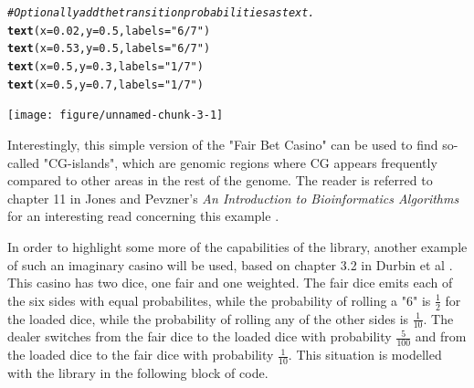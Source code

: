 \documentclass{article}\usepackage[]{graphicx}\usepackage[]{color}
\makeatletter
\newcommand{\hlnum}[1]{\textcolor[rgb]{0.686,0.059,0.569}{#1}}%
\newcommand{\hlstr}[1]{\textcolor[rgb]{0.192,0.494,0.8}{#1}}%
\newcommand{\hlcom}[1]{\textcolor[rgb]{0.678,0.584,0.686}{\textit{#1}}}%
\newcommand{\hlstd}[1]{\textcolor[rgb]{0.345,0.345,0.345}{#1}}%
\newcommand{\hlkwc}[1]{\textcolor[rgb]{0.333,0.667,0.333}{#1}}%
\newcommand{\hlkwd}[1]{\textcolor[rgb]{0.737,0.353,0.396}{\textbf{#1}}}%
\newenvironment{kframe}{%
 \def\at@end@of@kframe{}%
 \ifinner\ifhmode%
  \def\at@end@of@kframe{\end{minipage}}%
  \begin{minipage}{\columnwidth}%
 \fi\fi%
 \def\FrameCommand##1{\hskip\@totalleftmargin \hskip-\fboxsep
 \colorbox{shadecolor}{##1}\hskip-\fboxsep
     \hskip-\linewidth \hskip-\@totalleftmargin \hskip\columnwidth}%
 \MakeFramed {\advance\hsize-\width
   \@totalleftmargin\z@ \linewidth\hsize
   \@setminipage}}%
 {\par\unskip\endMakeFramed%
 \at@end@of@kframe}
\newenvironment{knitrout}{}{} %
\makeatother
\begin{document}
\begin{center}
\begin{knitrout}
\begin{kframe}
\begin{alltt}
\hlcom{# Optionally add the transition probabilities as text.}
\hlkwd{text}\hlstd{(}\hlkwc{x} \hlstd{=} \hlnum{0.02}\hlstd{,} \hlkwc{y} \hlstd{=} \hlnum{0.5}\hlstd{,} \hlkwc{labels} \hlstd{=} \hlstr{"6/7"}\hlstd{)}
\hlkwd{text}\hlstd{(}\hlkwc{x} \hlstd{=} \hlnum{0.53}\hlstd{,} \hlkwc{y} \hlstd{=} \hlnum{0.5}\hlstd{,} \hlkwc{labels} \hlstd{=} \hlstr{"6/7"}\hlstd{)}
\hlkwd{text}\hlstd{(}\hlkwc{x} \hlstd{=} \hlnum{0.5}\hlstd{,} \hlkwc{y} \hlstd{=} \hlnum{0.3}\hlstd{,} \hlkwc{labels} \hlstd{=} \hlstr{"1/7"}\hlstd{)}
\hlkwd{text}\hlstd{(}\hlkwc{x} \hlstd{=} \hlnum{0.5}\hlstd{,} \hlkwc{y} \hlstd{=} \hlnum{0.7}\hlstd{,} \hlkwc{labels} \hlstd{=} \hlstr{"1/7"}\hlstd{)}
\end{alltt}
\end{kframe}
\texttt{[image: figure/unnamed-chunk-3-1]} 
\end{knitrout}
\end{center}

Interestingly, this simple version of the "Fair Bet Casino" can be used to find so-called "CG-islands", which are genomic regions where CG appears frequently compared to other areas in the rest of the genome. The reader is referred to chapter 11 in Jones and Pevzner's \textit{An Introduction to Bioinformatics Algorithms} for an interesting read concerning this example \cite{Jones2004}.

In order to highlight some more of the capabilities of the library, another example of such an imaginary casino will be used, based on chapter 3.2 in Durbin et al \cite{Durbin1998}. This casino has two dice, one fair and one weighted. The fair dice emits each of the six sides with equal probabilites, while the probability of rolling a "6" is $\frac{1}{2}$ for the loaded dice, while the probability of rolling any of the other sides is $\frac{1}{10}$. The dealer switches from the fair dice to the loaded dice with probability $\frac{5}{100}$ and from the loaded dice to the fair dice with probability $\frac{1}{10}$. This situation is modelled with the library in the following block of code. 
\end{document}

